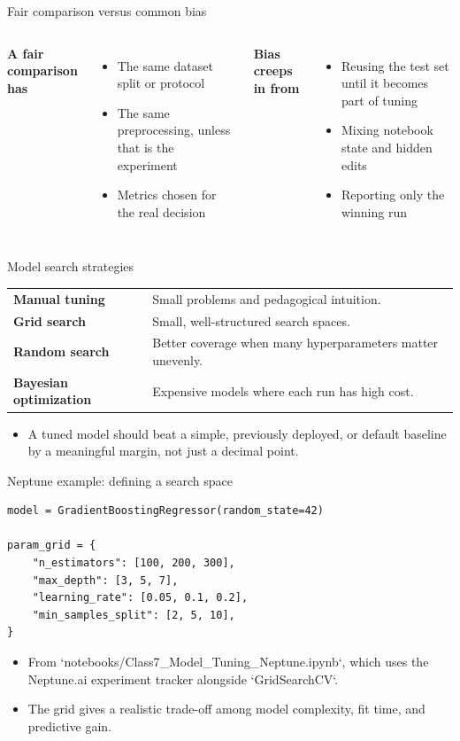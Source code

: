 \begin{frame}{Fair comparison versus common bias}
\begin{columns}[T]
\textbf{A fair comparison has}
\begin{itemize}
\item The same dataset split or protocol
\item The same preprocessing, unless that is the experiment
\item Metrics chosen for the real decision
\end{itemize}
\textbf{Bias creeps in from}
\begin{itemize}
\item Reusing the test set until it becomes part of tuning
\item Mixing notebook state and hidden edits
\item Reporting only the winning run
\end{itemize}
\end{columns}
\coursefooter
\end{frame}

\begin{frame}{Model search strategies}
\begin{tabularx}{\textwidth}{>{\bfseries}l X}
Manual tuning & Small problems and pedagogical intuition. \\
Grid search & Small, well-structured search spaces. \\
Random search & Better coverage when many hyperparameters matter unevenly. \\
Bayesian optimization & Expensive models where each run has high cost. \\
\end{tabularx}
\vspace{0.4em}
\begin{itemize}
\item A tuned model should beat a simple, previously deployed, or default baseline by a meaningful margin, not just a decimal point.
\end{itemize}
\coursefooter
\end{frame}

\begin{frame}[fragile]{Neptune example: defining a search space}
\begin{lstlisting}[style=coursepython]
model = GradientBoostingRegressor(random_state=42)

param_grid = {
    "n_estimators": [100, 200, 300],
    "max_depth": [3, 5, 7],
    "learning_rate": [0.05, 0.1, 0.2],
    "min_samples_split": [2, 5, 10],
}
\end{lstlisting}
\begin{itemize}
\item From `notebooks/Class7_Model_Tuning_Neptune.ipynb`, which uses the Neptune.ai experiment tracker alongside `GridSearchCV`.
\item The grid gives a realistic trade-off among model complexity, fit time, and predictive gain.
\end{itemize}
\coursefooter
\end{frame}

